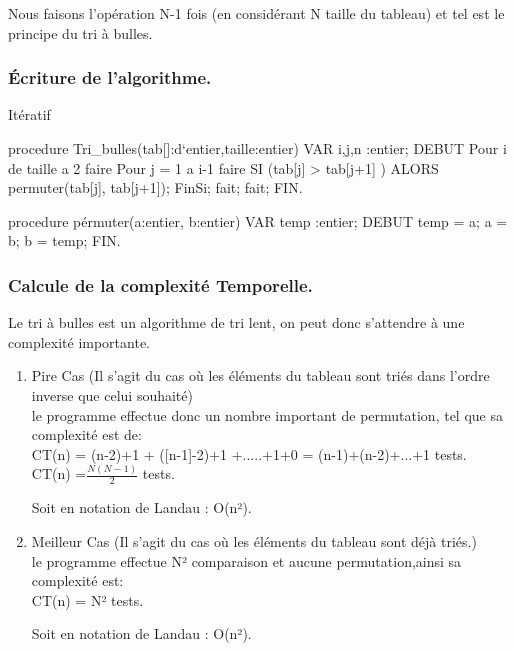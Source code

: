 \documentclass[12pt]{article}
\begin{document}
 Nous faisons l'opération N-1 fois (en considérant N taille du tableau) et tel est le principe du tri à bulles.

\subsubsection{Écriture de l'algorithme.}
 Itératif
	\begin{sql}
procedure Tri_bulles(tab[]:d`entier,taille:entier)
	VAR
		i,j,n :entier;
	DEBUT
		Pour i de taille a 2 
		faire
			Pour j = 1 a i-1 
			faire
				SI (tab[j] > tab[j+1] ) 
				ALORS permuter(tab[j], tab[j+1]);
				FinSi;
			fait;
		fait;
	FIN.
	
procedure pérmuter(a:entier, b:entier)
	VAR
		temp :entier;
	DEBUT
		temp = a;
		a = b;
		b = temp;
	FIN.
	\end{sql}
	


\subsubsection{Calcule de la complexité Temporelle. }
Le tri à bulles est un algorithme de tri lent, on peut donc s'attendre à une complexité importante.

\begin{enumerate}
	\item Pire Cas
	(Il s'agit du cas où les éléments du tableau sont triés dans l'ordre inverse que celui souhaité)\\
	
	le programme effectue donc un nombre important de permutation, tel que sa complexité est de:\\
	\color{blue}
CT(n) = (n-2)+1 + ([n-1]-2)+1 +.....+1+0 = (n-1)+(n-2)+...+1 tests.\\

CT(n) =$\frac{N(N-1)}{2}$ tests.\\

	\color{black}

Soit en notation de Landau :
\color{blue}
 O(n²).\\
 
\color{black}

	
	\item Meilleur Cas
	(Il s'agit du cas où les éléments du tableau sont déjà triés.)\\
	
	 le programme effectue N² comparaison et aucune permutation,ainsi sa complexité est:\\
	 \color{blue}
	 CT(n) = N² tests.
	\color{black}

Soit en notation de Landau :
\color{blue}
 O(n²).
\color{black}

\end{enumerate}
\end{document}
